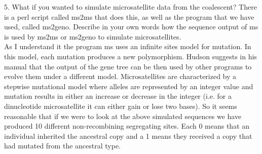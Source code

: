 \documentclass[11pt, oneside]{article}
\begin{document}
5. What if you wanted to simulate microsatellite data from the coalescent? There is a perl script called ms2ms that does this, as well as the program that we have used, called ms2geno. Describe in your own words how the sequence output of ms is used by ms2ms or ms2geno to simulate microsatellites.\\

As I understand it the program ms uses an infinite sites model for mutation. In this model, each mutation produces a new
polymorphism. Hudson suggests in his manual that the output of the gene tree can be then used by other
programs to evolve them under a different model. Microsatellites are characterized by a stepwise mutational model
where alleles are represented by an integer value and mutation results in either an increase or decrease in the 
integer (i.e. for a dinucleotide microsatellite it can either gain or lose two bases). So it seems reasonable that if we were 
to look at the above simulated sequences we have produced 10 different non-recombining segregating sites. 
Each 0 means that an individual inherited the ancestral copy and a 1 means they received a copy that had
mutated from the ancestral type. 




\end{document}

